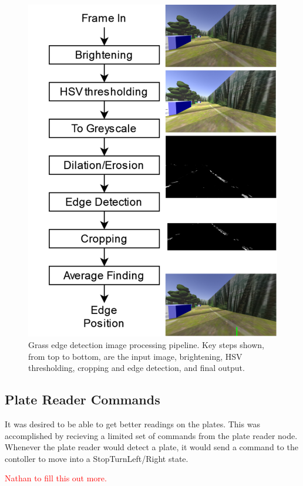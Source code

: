 \documentclass[titlepage, twocolumn]{article}
\newcommand{\red}[1]{\textcolor{red}{#1}}
\begin{document}
            \begin{figure}
                \begin{center}
                    \includegraphics[width=0.5\linewidth]{grass-photos.png}
                \end{center}
                \caption{Grass edge detection image processing pipeline. Key steps shown, from top to bottom, are the input image, brightening, HSV thresholding, cropping and edge detection, and final output.}
                \label{fig:grasspipeline}
            \end{figure}

    \subsection{Plate Reader Commands} \label{platereadercontrol}

        It was desired to be able to get better readings on the plates. This was accomplished by recieving a limited set of commands from the plate reader node. Whenever the plate reader would detect a plate, it would send a command to the contoller to move into a StopTurn{Left/Right} state. 
    
        \red{Nathan to fill this out more.}
\end{document}
